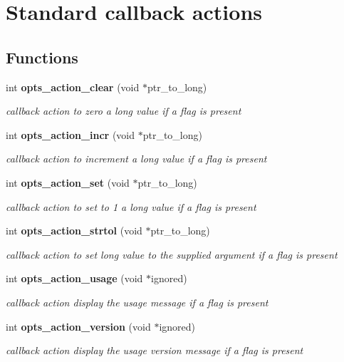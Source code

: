 \section{Standard callback actions}
\label{group__opts__actions}
\subsection*{Functions}
\begin{CompactItemize}
\item 
int {\bf opts\_\-action\_\-clear} (void $\ast$ptr\_\-to\_\-long)
\begin{CompactList}\small\item\em callback action to zero a long value if a flag is present\item\end{CompactList}\item 
int {\bf opts\_\-action\_\-incr} (void $\ast$ptr\_\-to\_\-long)
\begin{CompactList}\small\item\em callback action to increment a long value if a flag is present\item\end{CompactList}\item 
int {\bf opts\_\-action\_\-set} (void $\ast$ptr\_\-to\_\-long)
\begin{CompactList}\small\item\em callback action to set to 1 a long value if a flag is present\item\end{CompactList}\item 
int {\bf opts\_\-action\_\-strtol} (void $\ast$ptr\_\-to\_\-long)
\begin{CompactList}\small\item\em callback action to set long value to the supplied argument if a flag is present\item\end{CompactList}\item 
int {\bf opts\_\-action\_\-usage} (void $\ast$ignored)
\begin{CompactList}\small\item\em callback action display the usage message if a flag is present\item\end{CompactList}\item 
int {\bf opts\_\-action\_\-version} (void $\ast$ignored)
\begin{CompactList}\small\item\em callback action display the usage version message if a flag is present\item\end{CompactList}\end{CompactItemize}



